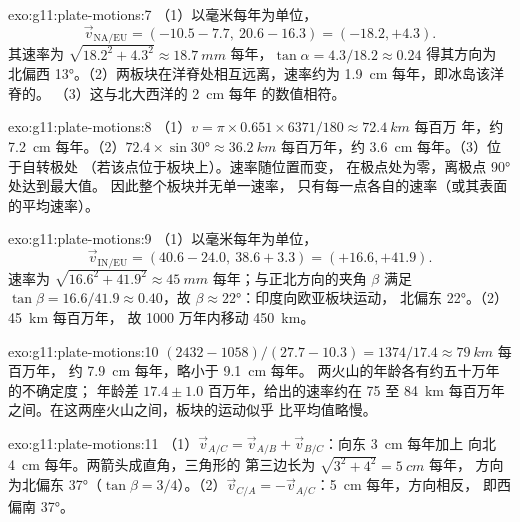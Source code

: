 \begin{solution}{exo:g11:plate-motions:7}
（1）以毫米每年为单位，
\[
  \vec v_{\mathrm{NA/EU}} = (-10.5 - 7.7,\ 20.6 - 16.3) = (-18.2, +4.3).
\] 其速率为 $\sqrt{18.2^2 + 4.3^2} \approx
\qty{18.7}{mm}$ 每年，$\tan\alpha = 4.3/18.2 \approx 0.24$ 得其方向为
北偏西 \ang{13}。（2）两板块在洋脊处相互远离，速率约为
\qty{1.9}{cm} 每年，即冰岛该洋脊的。
（3）这与北大西洋的 \qty{2}{cm} 每年
的数值相符。
\end{solution}

\begin{solution}{exo:g11:plate-motions:8}
（1）$v = \pi \times 0.651 \times 6371/180 \approx \qty{72.4}{km}$ 每百万
年，约 \qty{7.2}{cm} 每年。（2）$72.4 \times \sin\ang{30} \approx
\qty{36.2}{km}$ 每百万年，约 \qty{3.6}{cm} 每年。（3）位于自转极处
（若该点位于板块上）。速率随位置而变，
在极点处为零，离极点 \ang{90} 处达到最大值。
因此整个板块并无单一速率，
只有每一点各自的速率（或其表面的平均速率）。
\end{solution}

\begin{solution}{exo:g11:plate-motions:9}
（1）以毫米每年为单位，
\[
  \vec v_{\mathrm{IN/EU}} = (40.6 - 24.0,\ 38.6 + 3.3) = (+16.6, +41.9).
\] 速率为 $\sqrt{16.6^2 + 41.9^2} \approx
\qty{45}{mm}$ 每年；与正北方向的夹角 $\beta$ 满足 $\tan\beta =
16.6/41.9 \approx 0.40$，故 $\beta \approx \ang{22}$：印度向欧亚板块运动，
北偏东 \ang{22}。（2）\qty{45}{km} 每百万年，
故 1000 万年内移动 \qty{450}{km}。
\end{solution}

\begin{solution}{exo:g11:plate-motions:10}
$(2432 - 1058)/(27.7 - 10.3) = 1374/17.4 \approx \qty{79}{km}$ 每百万年，
约 \qty{7.9}{cm} 每年，略小于 \qty{9.1}{cm} 每年。
两火山的年龄各有约五十万年的不确定度；
年龄差 $17.4 \pm 1.0$ 百万年，给出的速率约在 75 至
\qty{84}{km} 每百万年之间。在这两座火山之间，板块的运动似乎
比平均值略慢。
\end{solution}

\begin{solution}{exo:g11:plate-motions:11}
（1）$\vec v_{A/C} = \vec v_{A/B} + \vec v_{B/C}$：向东 \qty{3}{cm} 每年加上
向北 \qty{4}{cm} 每年。两箭头成直角，三角形的
第三边长为 $\sqrt{3^2 + 4^2} = \qty{5}{cm}$ 每年，
方向为北偏东 \ang{37}（$\tan\beta = 3/4$）。（2）$\vec v_{C/A}
= -\vec v_{A/C}$：\qty{5}{cm} 每年，方向相反，
即西偏南 \ang{37}。
\end{solution}

